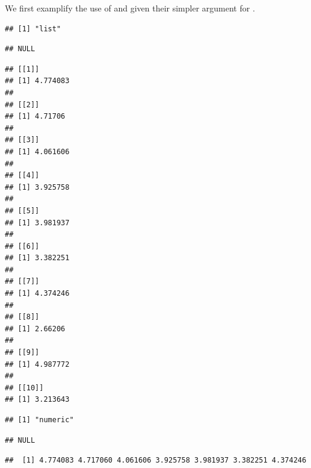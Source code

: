 \documentclass[krantz2,ChapterTOCs]{krantz}\usepackage{knitr}
\begin{document}
We first examplify the use of  and  given their simpler argument for .
\begin{knitrout}\footnotesize
{}\color{fgcolor}\begin{kframe}
\begin{alltt}
\hlstd{(}\hlstd{)}
 \hlkwb{<-} \hlstd{(}\hlstd{)}
 \hlkwb{<-} \hlstd{(}\hlstd{,} \hlstd{) \{} \hlopt{+} 
 \hlkwb{<-} \hlstd{(}     \hlstd{=} \hlstd{)}
\end{alltt}
\begin{verbatim}
## [1] "list"
\end{verbatim}
\begin{alltt}
\end{alltt}
\begin{verbatim}
## NULL
\end{verbatim}
\begin{alltt}
\end{alltt}
\begin{verbatim}
## [[1]]
## [1] 4.774083
## 
## [[2]]
## [1] 4.71706
## 
## [[3]]
## [1] 4.061606
## 
## [[4]]
## [1] 3.925758
## 
## [[5]]
## [1] 3.981937
## 
## [[6]]
## [1] 3.382251
## 
## [[7]]
## [1] 4.374246
## 
## [[8]]
## [1] 2.66206
## 
## [[9]]
## [1] 4.987772
## 
## [[10]]
## [1] 3.213643
\end{verbatim}
\begin{alltt}
 \hlkwb{<-} \hlstd{(}     \hlstd{=} \hlstd{)}
\end{alltt}
\begin{verbatim}
## [1] "numeric"
\end{verbatim}
\begin{alltt}
\end{alltt}
\begin{verbatim}
## NULL
\end{verbatim}
\begin{alltt}
\end{alltt}
\begin{verbatim}
##  [1] 4.774083 4.717060 4.061606 3.925758 3.981937 3.382251 4.374246

\end{verbatim}
\end{kframe}
\end{knitrout}
\end{document}

